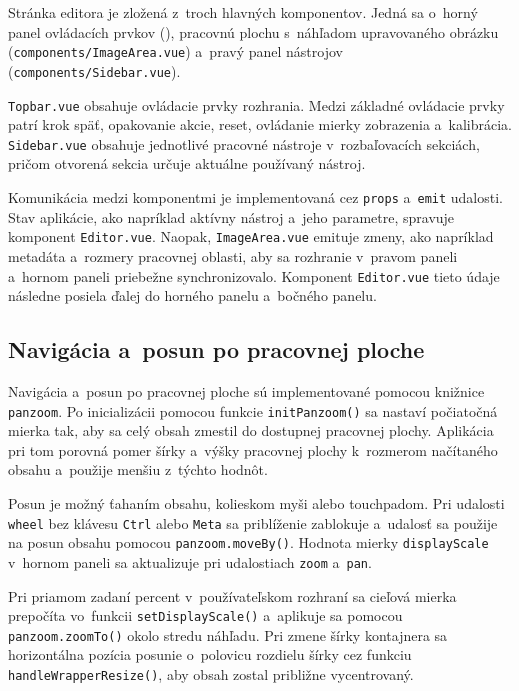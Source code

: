 Stránka editora je zložená z~troch hlavných komponentov. Jedná sa o~horný panel ovládacích prvkov (\texttt{}), pracovnú plochu s~náhľadom upravovaného obrázku (\texttt{components/ImageArea.vue}) a~pravý panel nástrojov (\texttt{components/Sidebar.vue}). 

\texttt{Topbar.vue} obsahuje ovládacie prvky rozhrania. Medzi základné ovládacie prvky patrí krok späť, opakovanie akcie, reset, ovládanie mierky zobrazenia a~kalibrácia. \texttt{Sidebar.vue} obsahuje jednotlivé pracovné nástroje v~rozbaľovacích sekciách, pričom otvorená sekcia určuje aktuálne používaný nástroj.

Komunikácia medzi komponentmi je implementovaná cez \texttt{props} a~\texttt{emit} udalosti.  Stav aplikácie, ako napríklad aktívny nástroj a~jeho parametre, spravuje komponent \texttt{Editor.vue}. Naopak, \texttt{ImageArea.vue} emituje zmeny, ako napríklad metadáta a~rozmery pracovnej oblasti, aby sa rozhranie v~pravom paneli a~hornom paneli priebežne synchronizovalo. Komponent \texttt{Editor.vue} tieto údaje následne posiela ďalej do horného panelu a~bočného panelu.

\subsection{Navigácia a~posun po pracovnej ploche}

Navigácia a~posun po pracovnej ploche sú implementované pomocou knižnice \texttt{panzoom}. Po inicializácii pomocou funkcie \texttt{initPanzoom()} sa nastaví počiatočná mierka tak, aby sa celý obsah zmestil do dostupnej pracovnej plochy. Aplikácia pri tom porovná pomer šírky a~výšky pracovnej plochy k~rozmerom načítaného obsahu a~použije menšiu z~týchto hodnôt.

Posun je možný ťahaním obsahu, kolieskom myši alebo touchpadom. Pri udalosti \texttt{wheel} bez klávesu \texttt{Ctrl} alebo \texttt{Meta} sa priblíženie zablokuje a~udalosť sa použije na posun obsahu pomocou \texttt{panzoom.moveBy()}. Hodnota mierky \texttt{displayScale} v~hornom paneli sa aktualizuje pri udalostiach \texttt{zoom} a~\texttt{pan}.

Pri priamom zadaní percent v~používateľskom rozhraní sa cieľová mierka prepočíta vo~funkcii \texttt{setDisplayScale()} a~aplikuje sa pomocou \texttt{panzoom.zoomTo()} okolo stredu náhľadu. Pri zmene šírky kontajnera sa horizontálna pozícia posunie o~polovicu rozdielu šírky cez funkciu \texttt{handleWrapperResize()}, aby obsah zostal približne vycentrovaný.

